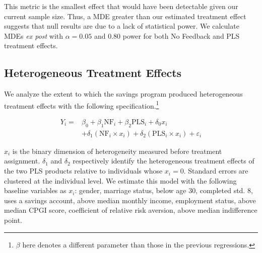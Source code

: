 \documentclass[11pt]{article}
\begin{document}
		This metric is the smallest effect that would have been detectable given our current sample size. Thus, a MDE greater than our estimated treatment effect suggests that null results are due to a lack of statistical power. We calculate MDEs \textit{ex post} with $\alpha = 0.05$ and 0.80 power for both No Feedback and PLS treatment effects.


	\subsection{Heterogeneous Treatment Effects}

		We analyze the extent to which the savings program produced heterogeneous treatment effects with the following specification.\footnote{$\beta$ here denotes a different parameter than those in the previous regressions.}

		\begin{equation} \begin{split}
		Y_{i} = & \beta_{0} + \beta_{1}\text{NF}_{i} + \beta_{2}\text{PLS}_{i} + \delta_{0}x_{i} \\
					& + \delta_{1}(\text{NF}_{i} \times x_{i}) + \delta_{2}(\text{PLS}_{i} \times x_{i}) + \varepsilon_{i}
		\end{split} \label{eq:heteffect} \end{equation}

		$x_{i}$ is the binary dimension of heterogeneity measured before treatment assignment. $\delta_{1}$ and $\delta_{2}$ respectively identify the heterogeneous treatment effects of the two PLS products relative to individuals whose $x_{i} = 0$. Standard errors are clustered at the individual level. We estimate this model with the following baseline variables as $x_{i}$: gender, marriage status, below age 30, completed std. 8, uses a savings account, above median monthly income, employment status, above median CPGI score, coefficient of relative risk aversion, above median indifference point.
\end{document}
